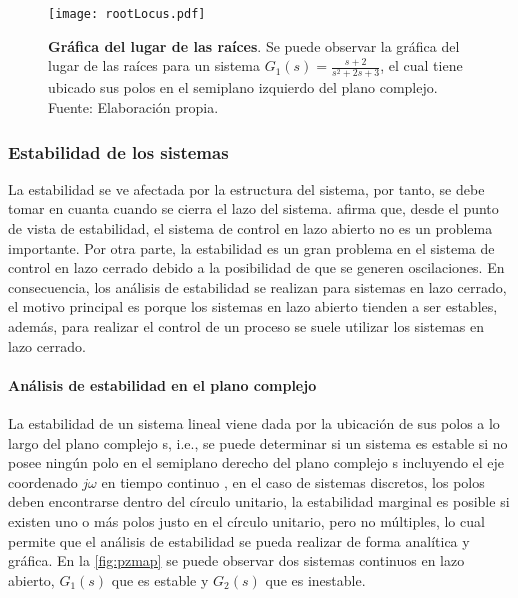             \begin{figure}[htb]
                \centering
                \texttt{[image: rootLocus.pdf]}
                \caption[Ejemplo de gráfica del lugar de las raíces]{\textbf{Gráfica del lugar de las raíces}. Se puede observar la gráfica del lugar de las raíces para un sistema $G_1(s) = \frac{s + 2}{s^2 + 2s + 3}$, el cual tiene ubicado sus polos en el semiplano izquierdo del plano complejo. Fuente: Elaboración propia.} 
                \label{fig:rootLocus}
            \end{figure}

        \subsubsection{Estabilidad de los sistemas}

            La estabilidad se ve afectada por la estructura del sistema, por tanto, se debe tomar en cuanta cuando se cierra el lazo del sistema. \textcite{ogata2003ingenieria} afirma que, desde el punto de vista de estabilidad, el sistema de control en lazo abierto no es un problema importante. Por otra parte, la estabilidad es un gran problema en el sistema de control en lazo cerrado debido a la posibilidad de que se generen oscilaciones. En consecuencia, los análisis de estabilidad se realizan para sistemas en lazo cerrado, el motivo principal es porque los sistemas en lazo abierto tienden a ser estables, además, para realizar el control de un proceso se suele utilizar los sistemas en lazo cerrado.

            \paragraph{Análisis de estabilidad en el plano complejo}
            
                La estabilidad de un sistema lineal viene dada por la ubicación de sus polos a lo largo del plano complejo s, i.e., se puede determinar si un sistema es estable si no posee ningún polo en el semiplano derecho del plano complejo s incluyendo el eje coordenado $j\omega$ en tiempo continuo \Parencite{ogata2003ingenieria}, en el caso de sistemas discretos, los polos deben encontrarse dentro del círculo unitario, la estabilidad marginal es posible si existen uno o más polos justo en el círculo unitario, pero no múltiples, lo cual permite que el análisis de estabilidad se pueda realizar de forma analítica y gráfica. En la \cref{fig:pzmap} se puede observar dos sistemas continuos en lazo abierto, $G_1(s)$ que es estable y $G_2(s)$ que es inestable.


